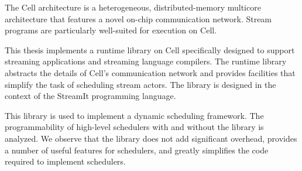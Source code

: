 %
% 
% 
%
The Cell architecture is a heterogeneous, distributed-memory multicore architecture that features a novel on-chip communication network. Stream programs are particularly well-suited for execution on Cell.

This thesis implements a runtime library on Cell specifically designed to support streaming applications and streaming language compilers. The runtime library abstracts the details of Cell's communication network and provides facilities that simplify the task of scheduling stream actors. The library is designed in the context of the StreamIt programming language.

This library is used to implement a dynamic scheduling framework. The programmability of high-level schedulers with and without the library is analyzed. We observe that the library does not add significant overhead, provides a number of useful features for schedulers, and greatly simplifies the code required to implement schedulers.
